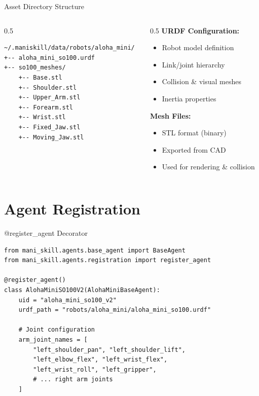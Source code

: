 \documentclass[aspectratio=169]{beamer}
\begin{document}
\begin{frame}[fragile]{Asset Directory Structure}
\begin{columns}
\begin{column}{0.5\textwidth}
\begin{lstlisting}[basicstyle=\ttfamily\tiny,numbers=none,frame=none]
~/.maniskill/data/robots/aloha_mini/
+-- aloha_mini_so100.urdf
+-- so100_meshes/
    +-- Base.stl
    +-- Shoulder.stl
    +-- Upper_Arm.stl
    +-- Forearm.stl
    +-- Wrist.stl
    +-- Fixed_Jaw.stl
    +-- Moving_Jaw.stl
\end{lstlisting}
\end{column}
\begin{column}{0.5\textwidth}
    \textbf{URDF Configuration:}
    \begin{itemize}
        \item Robot model definition
        \item Link/joint hierarchy
        \item Collision \& visual meshes
        \item Inertia properties
    \end{itemize}

    \vspace{0.2cm}

    \textbf{Mesh Files:}
    \begin{itemize}
        \item STL format (binary)
        \item Exported from CAD
        \item Used for rendering \& collision
    \end{itemize}
\end{column}
\end{columns}
\end{frame}

\section{Agent Registration}

\begin{frame}[fragile]{@register\_agent Decorator}
\begin{lstlisting}
from mani_skill.agents.base_agent import BaseAgent
from mani_skill.agents.registration import register_agent

@register_agent()
class AlohaMiniSO100V2(AlohaMiniBaseAgent):
    uid = "aloha_mini_so100_v2"
    urdf_path = "robots/aloha_mini/aloha_mini_so100.urdf"

    # Joint configuration
    arm_joint_names = [
        "left_shoulder_pan", "left_shoulder_lift",
        "left_elbow_flex", "left_wrist_flex",
        "left_wrist_roll", "left_gripper",
        # ... right arm joints
    ]
\end{lstlisting}
\end{frame}
\end{document}
